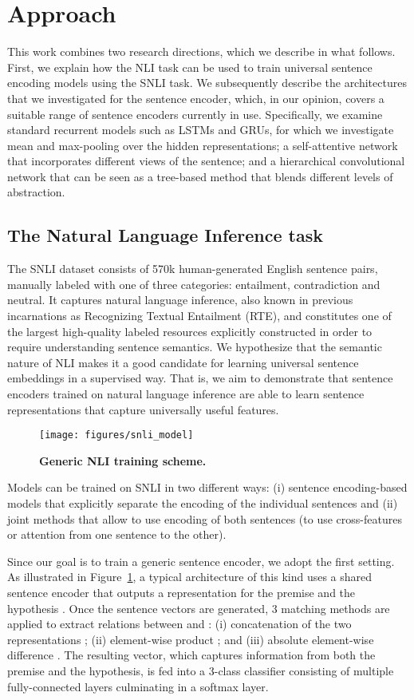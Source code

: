 \documentclass[11pt,letterpaper]{article}
\begin{document}
\section{Approach}

This work combines two research directions, which we describe in what follows.
First, we explain how the NLI task can be used to train universal sentence encoding models using the SNLI task.
We subsequently describe the architectures that we investigated for the sentence encoder, which, in our opinion, covers a suitable range of sentence encoders currently in use. Specifically, we examine standard recurrent models such as LSTMs and GRUs, for which we investigate mean and max-pooling over the hidden representations; a self-attentive network that incorporates different views of the sentence; and a hierarchical convolutional network that can be seen as a tree-based method that blends different levels of abstraction. 


\subsection{The Natural Language Inference task}
The SNLI dataset consists of 570k human-generated English sentence pairs, manually labeled with one of three categories: entailment, contradiction and neutral. It captures natural language inference, also known in previous incarnations as Recognizing Textual Entailment (RTE), and constitutes one of the largest high-quality labeled resources explicitly constructed in order to require understanding sentence semantics.
We hypothesize that the semantic nature of NLI makes it a good candidate for learning universal sentence embeddings in a supervised way. That is, we aim to demonstrate that sentence encoders trained on natural language inference are able to learn sentence representations that capture universally useful features.

\begin{figure}[ht]
  \centering
  \texttt{[image: figures/snli\_model]}
    \caption{\bf Generic NLI training scheme.}
    \label{fig:snli}
\end{figure}

Models can be trained on SNLI in two different ways: (i) sentence encoding-based models that explicitly separate the encoding of the individual sentences and (ii) joint methods that allow to use encoding of both sentences (to use cross-features or attention from one sentence to the other).

Since our goal is to train a generic sentence encoder, we adopt the first setting. As illustrated in Figure~\ref{fig:snli}, a typical architecture of this kind uses a shared sentence encoder that outputs a representation for the premise  and the hypothesis . Once the sentence vectors are generated, 3 matching methods are applied to extract relations between  and  : (i) concatenation of the two representations ; (ii) element-wise product ; and (iii) absolute element-wise difference . The resulting vector, which captures information from both the premise and the hypothesis, is fed into a 3-class classifier consisting of multiple fully-connected layers culminating in a softmax layer.
\end{document}
